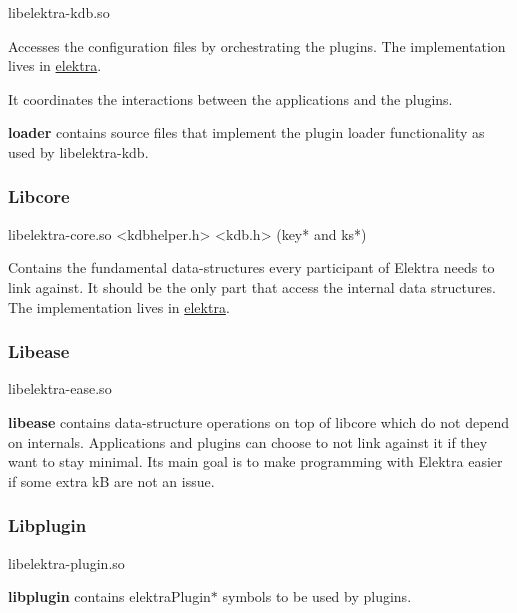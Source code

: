 \begin{DoxyCode}
libelektra-kdb.so
\end{DoxyCode}


Accesses the configuration files by orchestrating the plugins. The implementation lives in \hyperlink{md_src_libs_elektra_README_src_libs_elektra_README_md}{elektra}.

It coordinates the interactions between the applications and the plugins.

{\bfseries loader} contains source files that implement the plugin loader functionality as used by {\ttfamily libelektra-\/kdb}.

\subsubsection*{Libcore}


\begin{DoxyCode}
libelektra-core.so
<kdbhelper.h>
<kdb.h> (key* and ks*)
\end{DoxyCode}


Contains the fundamental data-\/structures every participant of Elektra needs to link against. It should be the only part that access the internal data structures. The implementation lives in \hyperlink{md_src_libs_elektra_README_src_libs_elektra_README_md}{elektra}.

\subsubsection*{Libease}


\begin{DoxyCode}
libelektra-ease.so
\end{DoxyCode}


{\bfseries libease} contains data-\/structure operations on top of libcore which do not depend on internals. Applications and plugins can choose to not link against it if they want to stay minimal. Its main goal is to make programming with Elektra easier if some extra kB are not an issue.

\subsubsection*{Libplugin}


\begin{DoxyCode}
libelektra-plugin.so
\end{DoxyCode}


{\bfseries libplugin} contains {\ttfamily elektra\+Plugin$\ast$} symbols to be used by plugins.

